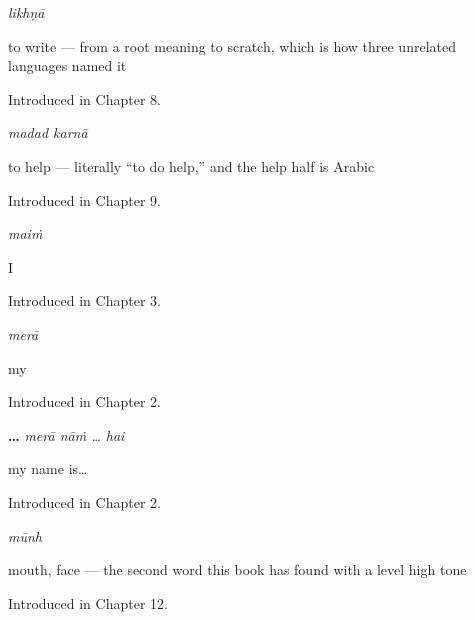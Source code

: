 \noindent\begin{minipage}[t]{\linewidth}
\raggedright
\textbf{}\enspace\emph{likhṇā}\par
\small to write — from a root meaning to scratch, which is how three unrelated languages named it\par
\footnotesize Introduced in Chapter 8.
\end{minipage}\par\medskip

\noindent\begin{minipage}[t]{\linewidth}
\raggedright
\textbf{ }\enspace\emph{madad karnā}\par
\small to help — literally “to do help,” and the help half is Arabic\par
\footnotesize Introduced in Chapter 9.
\end{minipage}\par\medskip

\noindent\begin{minipage}[t]{\linewidth}
\raggedright
\textbf{}\enspace\emph{maiṁ}\par
\small I\par
\footnotesize Introduced in Chapter 3.
\end{minipage}\par\medskip

\noindent\begin{minipage}[t]{\linewidth}
\raggedright
\textbf{}\enspace\emph{merā}\par
\small my\par
\footnotesize Introduced in Chapter 2.
\end{minipage}\par\medskip

\noindent\begin{minipage}[t]{\linewidth}
\raggedright
\textbf{  … }\enspace\emph{merā nāṁ … hai}\par
\small my name is…\par
\footnotesize Introduced in Chapter 2.
\end{minipage}\par\medskip

\noindent\begin{minipage}[t]{\linewidth}
\raggedright
\textbf{}\enspace\emph{mūnh}\par
\small mouth, face — the second word this book has found with a level high tone\par
\footnotesize Introduced in Chapter 12.
\end{minipage}\par\medskip

